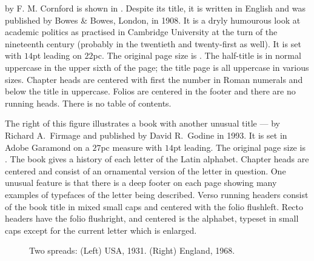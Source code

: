 \documentclass[10pt,a4paper,oneside,extrafontsizes]{memoir}%
\begin{document}
\begin{paracol}{2}
\switchEng
     by F. M. Cornford is shown in
. Despite its title, it is written in English and was published
by Bowes \& Bowes, London, in 1908. It is a dryly humourous look at academic
politics as practised in Cambridge University at the turn of the nineteenth
century (probably in the twentieth and twenty-first as well). 
It is set with $14$pt leading
on $22$pc. The original page size is .
The half-title 
is in normal uppercase in the upper
sixth of the page; the title page is all uppercase in
various sizes. Chapter heads are centered with first 
the number in Roman numerals and below the title in uppercase.
Folios are centered in the footer 
and there are no running heads. There is no table of contents.



The right of this figure illustrates a book with another unusual title ---
 by Richard A.~Firmage and published by
David R.~Godine in 1993. It is set in 
Adobe Garamond on a $27$pc measure
with $14$pt leading. The original page size is . The
book gives a history of each letter of the Latin alphabet. 
Chapter heads are centered and consist of an 
ornamental version of the letter in question. One
unusual feature is that there is a deep footer 
on each page showing many examples of typefaces of the letter being 
described. Verso running headers consist of the book
title in mixed small caps and centered with the folio flushleft.
Recto headers have the folio flushright, and centered is the alphabet, 
typeset in small caps except for the current letter which is enlarged.
\end{paracol}

\begin{figure}
\centering
\begin{minipage}[b]{\pwlayi}
\end{minipage}
\hfill
\begin{minipage}[b]{\pwlayi}
\end{minipage}
\caption[Two spreads: USA, 1931 and England, 1968]%
        {Two spreads: (Left) USA, 1931.
         (Right) England, 1968.} \label{fb:6}
\end{figure}
\end{document}
